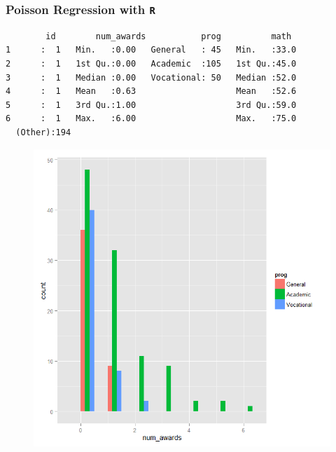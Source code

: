 \documentclass[00-GLMregslides.tex]{subfiles}
\begin{document}
%
%

\begin{frame}[fragile]
	
\frametitle{Poisson Regression with \texttt{R}}
\normalsize
	\begin{verbatim}
        id        num_awards           prog          math     
1      :  1   Min.   :0.00   General   : 45   Min.   :33.0  
2      :  1   1st Qu.:0.00   Academic  :105   1st Qu.:45.0  
3      :  1   Median :0.00   Vocational: 50   Median :52.0  
4      :  1   Mean   :0.63                    Mean   :52.6  
5      :  1   3rd Qu.:1.00                    3rd Qu.:59.0  
6      :  1   Max.   :6.00                    Max.   :75.0  
  (Other):194
\end{verbatim}
\end{frame}
\begin{frame}
	\begin{figure}
		\centering
		\includegraphics[width=0.8\linewidth]{poisson1}
		\caption{}
		\label{fig:poisson1}
	\end{figure}
	
	
\end{frame}
\end{document}
